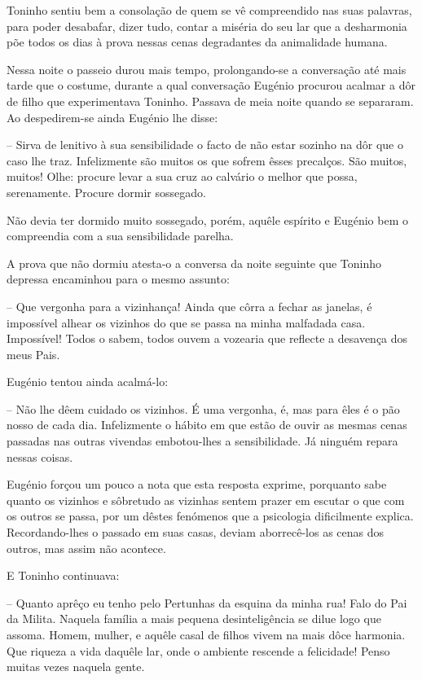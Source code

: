 \documentclass[9pt]{article}
\begin{document}
Toninho sentiu bem a consola\-ção de quem se vê compreendido nas suas
palavras, para poder desabafar, dizer tudo, contar a miséria do seu lar que
a desharmonia põe todos os dias à prova nessas cenas degradantes da animalidade
humana.

Nessa noite o passeio durou mais tempo, prolongando-se a conversa\-ção
até mais tarde que o costume, durante a qual conversa\-ção Eugé\-nio procurou
acalmar a dôr de fi\-lho que experimentava Toninho. Passava de meia noite
quan\-do se separaram. Ao despedirem-se ainda Eugé\-nio lhe disse:

-- Sirva de lenitivo à sua sensibilidade o facto de não estar sozinho
na dôr que o caso lhe traz. Infelizmente são muitos os que sofrem êsses
precalços. São muitos, muitos! O\-lhe: procure levar a sua cruz ao calvário
o me\-lhor que possa, serenamente. Procure dormir sossegado.

Não devia ter dormido muito sossegado, porém, a\-quê\-le espírito e Eugé\-nio bem
o compreendia com a sua sensibilidade pare\-lha.

A prova que não dormiu atesta-o a conversa da noite seguinte que Toninho
depressa encaminhou para o mesmo assunto:

-- Que vergonha para a vizinhan\-ça! Ainda que côrra a fechar as janelas, é impossível
a\-lhear os vizinhos do que se passa na minha malfadada casa.
Impossível! Todos o sabem, todos ouvem a vozearia que reflecte a desavença
dos meus Pais.

Eugé\-nio tentou ainda acalmá-lo:

-- Não lhe dêem cuidado os vizinhos. É uma vergonha, é, mas para êles é
o pão nosso de cada dia. Infelizmente o hábito em que estão de ouvir as
mesmas cenas passadas nas outras vivendas embotou-\-lhes a sensibilidade. Já
nin\-guém repara nessas coisas.

Eugé\-nio forçou um pouco a nota que esta resposta exprime, porquanto
sabe quanto os vizinhos e sôbretudo as vizinhas sentem prazer em escutar
o que com os outros se passa, por um dêstes fenómenos que a psicologia dificilmente explica. Recordando-\-lhes o passado em suas casas, deviam aborrecê-los as cenas dos outros, mas assim não acontece.

E Toninho continuava:

-- Quanto aprêço eu tenho pelo Pertunhas da esquina da minha rua! Falo
do Pai da Milita. Naquela fa\-mí\-lia a mais pequena desinteligência se dilue
logo que assoma. Homem, mu\-lher, e a\-quê\-le casal de fi\-lhos vivem na mais dôce harmonia. Que riqueza a vida da\-quê\-le lar, onde o ambiente rescende a felicidade! Penso muitas vezes naquela gente.
\end{document}
